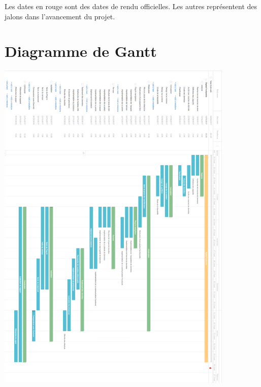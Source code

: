 Les dates en rouge sont des dates de rendu officielles.
Les autres représentent des jalons dans l’avancement du projet.

\section{Diagramme de Gantt}
	\includegraphics[width=0.85\textwidth]{images/annexes/cdc/gantt}